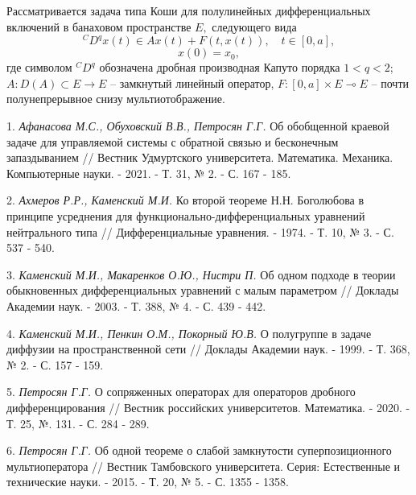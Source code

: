
\vzmscaption

Рассматривается задача типа Коши для полулинейных дифференциальных включений в банаховом пространстве $E,$ следующего вида
$$
  ^CD^q x\left( t\right)\in Ax(t)+F(t,x(t)),\quad t \in \left[0,a\right],  
$$
$$
x(0)=x_0,
$$
где символом $^{C}D^{q}$ обозначена дробная производная Капуто порядка  $1<q<2$; $A:D(A)\subset E \rightarrow E$ -- замкнутый линейный оператор, $F: [0,a] \times  E \multimap E$ -- почти полунепрерывное снизу мультиотображение.


\litlist

1. {\it Афанасова М.С., Обуховский В.В., Петросян Г.Г.} Об обобщенной краевой задаче для управляемой системы с обратной связью и бесконечным запаздыванием // Вестник Удмуртского университета. Математика. Механика. Компьютерные науки. - 2021. - Т. 31, № 2. -  С. 167 - 185.

2. {\it Ахмеров Р.Р., Каменский М.И.}  Ко второй теореме Н.Н. Боголюбова в принципе усреднения для функционально-дифференциальных уравнений нейтрального типа // Дифференциальные уравнения. - 1974. - Т. 10, № 3. - С. 537 - 540.

3. {\it Каменский М.И., Макаренков О.Ю., Нистри П.} Об одном подходе в теории обыкновенных дифференциальных уравнений с малым параметром // Доклады Академии наук. - 2003. - Т. 388, № 4. - С. 439 - 442.

4. {\it Каменский М.И., Пенкин О.М., Покорный Ю.В.} О полугруппе в задаче диффузии на пространственной сети // Доклады Академии наук. - 1999. - Т. 368, № 2. - С. 157 - 159.

5.	{\it Петросян Г.Г.} О сопряженных операторах для операторов дробного дифференцирования // Вестник российских университетов. Математика. - 2020. - Т. 25, №. 131. - С. 284 - 289.

6. {\it Петросян Г.Г.}  Об одной теореме о слабой замкнутости суперпозиционного мультиоператора // Вестник Тамбовского университета. Серия: Естественные и технические науки. - 2015. - Т. 20, № 5. - С. 1355 - 1358.

